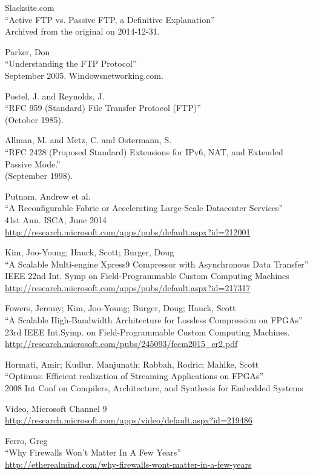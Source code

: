 \documentclass[dvipdfm]{book}
\begin{document}
\begin{thebibliography}{99}
 Slacksite.com\\
``Active FTP vs. Passive FTP, a Definitive Explanation''\\
Archived from the original on 2014-12-31.

 Parker, Don\\
``Understanding the FTP Protocol''\\
September 2005. Windowsnetworking.com.

 Postel, J. and Reynolds, J.\\
``RFC 959 (Standard) File Transfer Protocol (FTP)''\\
(October 1985).

 Allman, M. and Metz, C. and Ostermann, S.\\
``RFC 2428 (Proposed Standard) Extensions for IPv6, NAT, and 
Extended Passive Mode.''\\
(September 1998).

 Putnam, Andrew et al.\\
``A Reconfigurable Fabric or Accelerating Large-Scale Datacenter Services''\\
41st Ann. ISCA, June 2014\\
\url{http://research.microsoft.com/apps/pubs/default.aspx?id=212001}

 Kim, Joo-Young; Hauck, Scott; Burger, Doug\\
``A Scalable Multi-engine Xpress9 Compressor with Asynchronous Data Transfer''\\
IEEE 22nd Int. Symp on Field-Programmable Custom Computing Machines\\
\url{http://research.microsoft.com/apps/pubs/default.aspx?id=217317}

 Fowers, Jeremy; Kim, Joo-Young; Burger, Doug; Hauck, Scott\\
``A Scalable High-Bandwidth Architecture for Lossless Compression on FPGAs''\\
23rd IEEE Int.Symp. on Field-Programmable Custom Computing Machines.
\url{http://research.microsoft.com/pubs/245093/fccm2015\_cr2.pdf}

 Hormati, Amir; Kudlur, Manjunath; Rabbah, Rodric; Mahlke, Scott\\
``Optimus: Efficient realization of Streaming Applications on FPGAs''\\
2008 Int Conf on Compilers, Architecture, and Synthesis for Embedded Systems

 Video, Microsoft Channel 9\\
\url{http://research.microsoft.com/apps/video/default.aspx?id=219486}

 Ferro, Greg\\
``Why Firewalls Won't Matter In A Few Years''\\
\url{http://etherealmind.com/why-firewalls-wont-matter-in-a-few-years}

\end{thebibliography}
\end{document}
